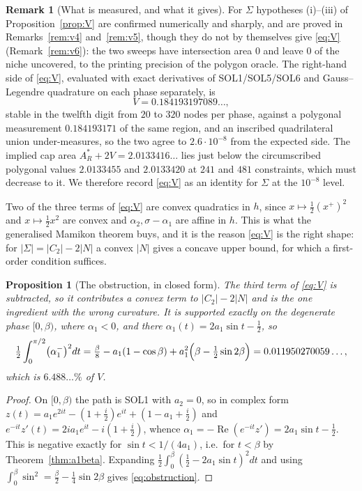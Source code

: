 \documentclass[11pt]{article}
\newtheorem{proposition}[theorem]{Proposition}
\theoremstyle{definition}
\newtheorem{remark}[theorem]{Remark}
\newcommand{\Sig}{\Sigma}
\begin{document}
\begin{remark}[What is measured, and what it gives]\label{rem:V}
For $\Sig$ hypotheses (i)--(iii) of Proposition~\ref{prop:V} are confirmed
numerically and sharply, and are proved in Remarks~\ref{rem:v4} and~\ref{rem:v5}, though
they do not by themselves give \eqref{eq:V} (Remark~\ref{rem:v6}): the two sweeps have
intersection area $0$ and leave
$0$ of the niche uncovered, to the printing precision of the polygon oracle. The
right-hand side of \eqref{eq:V}, evaluated with exact derivatives of
SOL1/SOL5/SOL6 and Gauss--Legendre quadrature on each phase separately, is
\[
  V=0.184193197089\ldots ,
\]
stable in the twelfth digit from $20$ to $320$ nodes per phase, against a
polygonal measurement $0.184193171$ of the same region, and an inscribed
quadrilateral union under-measures, so the two agree to $2.6\cdot10^{-8}$ from the
expected side. The implied cap area $A_R^\ast+2V=2.0133416\ldots$ lies just below
the circumscribed polygonal values $2.0133455$ and $2.0133420$ at $241$ and $481$
constraints, which must decrease to it. We therefore record \eqref{eq:V} as an
identity for $\Sig$ at the $10^{-8}$ level.

Two of the three terms of \eqref{eq:V} are convex quadratics in $h$, since
$x\mapsto\tfrac12(x^+)^2$ and $x\mapsto\tfrac12x^2$ are convex and
$\alpha_2,\sigma-\alpha_1$ are affine in $h$. This is what the generalised
Mamikon theorem buys, and it is the reason \eqref{eq:V} is the right shape: for
$|\Sig|=|C_2|-2|N|$ a convex $|N|$ gives a concave upper bound, for which a
first-order condition suffices.
\end{remark}

\begin{proposition}[The obstruction, in closed form]\label{prop:obstruction}
The third term of \eqref{eq:V} is subtracted, so it contributes a \emph{convex}
term to $|C_2|-2|N|$ and is the one ingredient with the wrong curvature. It is
supported exactly on the degenerate phase $[0,\beta)$, where $\alpha_1<0$, and
there $\alpha_1(t)=2a_1\sin t-\tfrac12$, so
\begin{equation}\label{eq:obstruction}
  \tfrac12\int_0^{\pi/2}\bigl(\alpha_1^-\bigr)^2dt
  =\tfrac{\beta}{8}-a_1(1-\cos\beta)+a_1^2\Bigl(\beta-\tfrac12\sin2\beta\Bigr)
  =0.011950270059\ldots,
\end{equation}
which is $6.488\ldots\%$ of $V$.
\end{proposition}

\begin{proof}
On $[0,\beta)$ the path is SOL1 with $a_2=0$, so in complex form
$z(t)=a_1e^{2it}-(1+\tfrac i2)e^{it}+(1-a_1+\tfrac i2)$ and
$e^{-it}z'(t)=2ia_1e^{it}-i(1+\tfrac i2)$, whence
$\alpha_1=-\operatorname{Re}(e^{-it}z')=2a_1\sin t-\tfrac12$. This is negative
exactly for $\sin t<1/(4a_1)$, i.e.\ for $t<\beta$ by
Theorem~\ref{thm:a1beta}. Expanding
$\tfrac12\int_0^\beta(\tfrac12-2a_1\sin t)^2dt$ and using
$\int_0^\beta\sin^2=\tfrac\beta2-\tfrac14\sin2\beta$ gives
\eqref{eq:obstruction}.
\end{proof}
\end{document}
